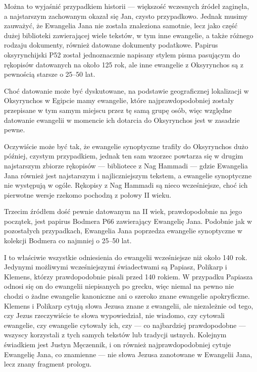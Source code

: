 Można to wyjaśnić przypadkiem historii — większość wczesnych źródeł zaginęła, a najstarszym zachowanym okazał się Jan, czysto przypadkowo.
Jednak musimy zauważyć, że Ewangelia Jana nie została znaleziona samotnie, lecz jako część dużej biblioteki zawierającej wiele tekstów, w tym inne ewangelie, a także różnego rodzaju dokumenty, również datowane dokumenty podatkowe.
Papirus oksyrynchijski P52 został jednoznacznie napisany stylem pisma pasującym do rękopisów datowanych na około 125 rok, ale inne ewangelie z Oksyrynchos są z pewnością starsze o 25–50 lat.

Choć datowanie może być dyskutowane, na podstawie geograficznej lokalizacji w Oksyrynchos w Egipcie mamy ewangelie, które najprawdopodobniej zostały przepisane w tym samym miejscu przez tę samą grupę osób, więc względne datowanie ewangelii w momencie ich dotarcia do Oksyrynchos jest w zasadzie pewne.

Oczywiście może być tak, że ewangelie synoptyczne trafiły do Oksyrynchos dużo później, czystym przypadkiem, jednak ten sam wzorzec powtarza się w drugim najstarszym zbiorze rękopisów — bibliotece z Nag Hammadi — gdzie Ewangelia Jana również jest najstarszym i najliczniejszym tekstem, a ewangelie synoptyczne nie występują w ogóle.
Rękopisy z Nag Hammadi są nieco wcześniejsze, choć ich pierwotne wersje rzekomo pochodzą z połowy II wieku.

Trzecim źródłem dość pewnie datowanym na II wiek, prawdopodobnie na jego początek, jest papirus Bodmera P66 zawierający Ewangelię Jana.
Podobnie jak w pozostałych przypadkach, Ewangelia Jana poprzedza ewangelie synoptyczne w kolekcji Bodmera co najmniej o 25–50 lat.

I to właściwie wszystkie odniesienia do ewangelii wcześniejsze niż około 140 rok.
Jedynymi możliwymi wcześniejszymi świadectwami są Papiasz, Polikarp i Klemens, którzy prawdopodobnie pisali przed 140 rokiem.
W przypadku Papiasza odnosi się on do ewangelii niepisanych po grecku, więc niemal na pewno nie chodzi o żadne ewangelie kanoniczne ani o szeroko znane ewangelie apokryficzne.
Klemens i Polikarp cytują słowa Jezusa znane z ewangelii, ale niezależnie od tego, czy Jezus rzeczywiście te słowa wypowiedział, nie wiadomo, czy cytowali ewangelie, czy ewangelie cytowały ich, czy — co najbardziej prawdopodobne — wszyscy korzystali z tych samych tekstów lub tradycji ustnych.
Kolejnym świadkiem jest Justyn Męczennik, i on również najprawdopodobniej cytuje Ewangelię Jana, co znamienne — nie słowa Jezusa zanotowane w Ewangelii Jana, lecz znany fragment prologu.

